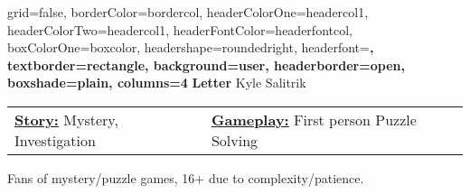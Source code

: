 \documentclass[archE1,portrait]{baposter}
\begin{document}
\background{ %

}

\begin{poster}
{
	grid=false,
	borderColor=bordercol, %
	headerColorOne=headercol1, %
	headerColorTwo=headercol1, %
	headerFontColor=headerfontcol, %
	boxColorOne=boxcolor, %
	headershape=roundedright, %
	headerfont=\Large\sf\bf, %
	textborder=rectangle,
	background=user,
	headerborder=open, %
	boxshade=plain,
	columns=4
}
{}
%
%
{
\sf\bf Letter} %
{\vspace{.5em} Kyle Salitrik\\ %
} %
%




{ 
	\begin{tabularx}{\textwidth}{ X | X }
	\underline{\textbf{Story:}} Mystery, Investigation & \underline{\textbf{Gameplay:}} First person Puzzle Solving
	\end{tabularx}
	\vspace*{-.6\baselineskip}
}


{ 
	Fans of mystery/puzzle games, 16+ due to complexity/patience.
}


\end{poster}
\end{document}
